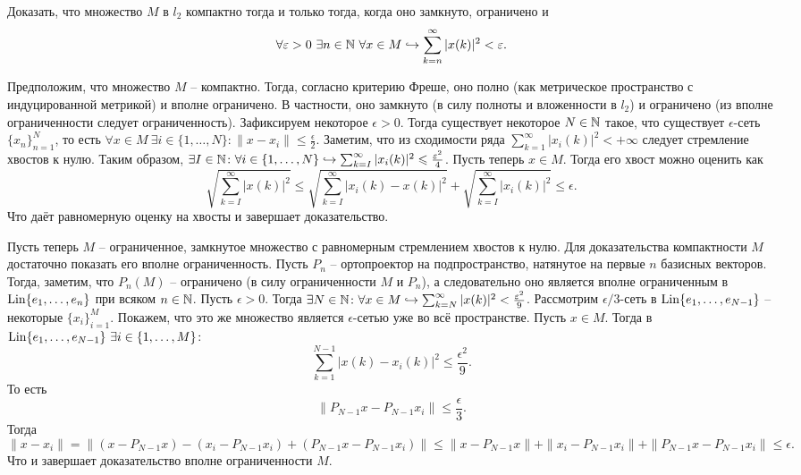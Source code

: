 \begin{task}[\S 3.11]
    Доказать, что множество $M$ в $l_2$ компактно тогда и только тогда, когда оно замкнуто, ограничено и
    \[
        \forall \epsilon > 0 \ \exists n \in \N \ \forall x \in M \hookrightarrow \sum\limits_{k = n}^{\infty} |x(k)|^2 < \epsilon.
    \]
\end{task}
\begin{solve}
    Предположим, что множество $M$ -- компактно. Тогда, согласно критерию Фреше, оно полно (как метрическое пространство с индуцированной метрикой) и вполне ограничено. В частности, оно замкнуто (в силу полноты и вложенности в $l_2$) и ограничено (из вполне ограниченности следует ограниченность). Зафиксируем некоторое $\epsilon > 0$. Тогда существует некоторое $N \in \mathbb{N}$ такое, что существует $\epsilon$-сеть $\{x_n\}_{n = 1}^{N}$, то есть $\forall x \in M \ \exists i \in \{1, \ldots, N\}\colon \|x - x_i\| \leq \frac{\epsilon}{2}$. Заметим, что из сходимости ряда $\sum_{k = 1}^{\infty} |x_i(k)|^2 < +\infty$ следует стремление хвостов к нулю. Таким образом, $\exists I \in \mathbb{N}\colon \forall i \in \{1, \ldots, N\} \hookrightarrow \sum_{k = I}^{\infty} |x_i(k)|^2 \leqslant \frac{\varepsilon^2}{4}$. Пусть теперь $x \in M$. Тогда его хвост можно оценить как
    \[
        \sqrt{\sum_{k = I}^{\infty} |x(k)|^2} \leq \sqrt{\sum_{k = I}^{\infty}|x_i(k) - x(k)|^2} + \sqrt{\sum_{k = I}^{\infty} |x_i(k)|^2} \leq \epsilon.
    \]
    Что даёт равномерную оценку на хвосты и завершает доказательство.

    Пусть теперь $M$ -- ограниченное, замкнутое множество с равномерным стремлением хвостов к нулю.
    Для доказательства компактности $M$ достаточно показать его вполне ограниченность.
    Пусть $P_n$ -- ортопроектор на подпространство, натянутое на первые $n$ базисных векторов.
    Тогда, заметим, что $P_n(M)$ -- ограничено (в силу ограниченности $M$ и $P_n$), а следовательно оно является вполне ограниченным в $\operatorname{Lin}\{e_1, \ldots, e_n\}$ при всяком $n \in \mathbb{N}$.
    Пусть $\epsilon > 0$.
    Тогда $\exists N \in \mathbb{N}\colon \forall x \in M \hookrightarrow \sum_{k = N}^{\infty} |x(k)|^2 < \frac{\varepsilon^2}{9}$.
    Рассмотрим $\epsilon/3$-сеть в $\operatorname{Lin}\{e_1, \ldots, e_{N - 1}\}$ -- некоторые $\{x_i\}_{i = 1}^M$.
    Покажем, что это же множество является $\epsilon$-сетью уже во всё пространстве.
    Пусть $x \in M$.
    Тогда в $\Lin\{e_1, \ldots, e_{N - 1}\} \ \exists i \in \{1, \ldots, M\}\colon$
    \[
        \sum_{k = 1}^{N - 1} |x(k) - x_i(k)|^2 \leq \frac{\epsilon^2}{9}.
    \]
    То есть
    \[
        \|P_{N- 1}x - P_{N - 1}x_i\| \leq \frac{\epsilon}{3}.
    \]
    Тогда
    \[
        \|x - x_i\| = \|(x - P_{N - 1}x) - (x_i - P_{N - 1}x_i) + (P_{N - 1}x - P_{N - 1}x_i)\| \leq \|x - P_{N - 1}x\| + \|x_i - P_{N - 1}x_i\| + \|P_{N - 1}x - P_{N - 1}x_i\| \leq \epsilon.
    \]
    Что и завершает доказательство вполне ограниченности $M$.
\end{solve}
